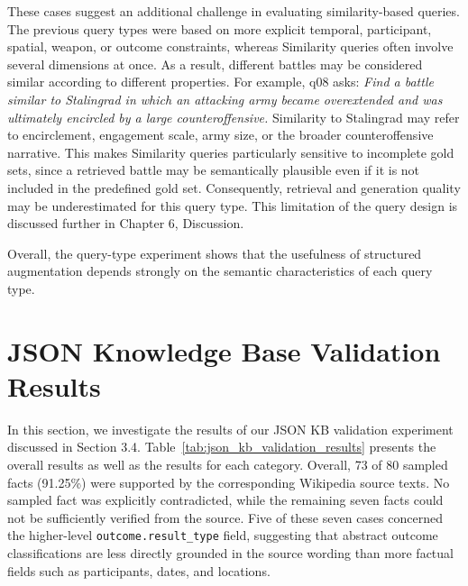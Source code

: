 These cases suggest an additional challenge in evaluating similarity-based queries. The previous query types were based on more explicit temporal, participant, spatial, weapon, or outcome constraints, whereas Similarity queries often involve several dimensions at once. As a result, different battles may be considered similar according to different properties. For example, q08 asks: \textit{Find a battle similar to Stalingrad in which an attacking army became overextended and was ultimately encircled by a large counteroffensive.} Similarity to Stalingrad may refer to encirclement, engagement scale, army size, or the broader counteroffensive narrative. This makes Similarity queries particularly sensitive to incomplete gold sets, since a retrieved battle may be semantically plausible even if it is not included in the predefined gold set. Consequently, retrieval and generation quality may be underestimated for this query type. This limitation of the query design is discussed further in Chapter 6, Discussion.

Overall, the query-type experiment shows that the usefulness of structured augmentation depends strongly on the semantic characteristics of each query type.
\section{JSON Knowledge Base Validation Results}
In this section, we investigate the results of our JSON KB validation experiment discussed in Section 3.4. Table~\ref{tab:json_kb_validation_results} presents the overall results as well as the results for each category. Overall, 73 of 80 sampled facts (91.25\%) were supported by the corresponding Wikipedia source texts. No sampled fact was explicitly contradicted, while the remaining seven facts could not be sufficiently verified from the source. Five of these seven cases concerned the higher-level \texttt{outcome.result\_type} field, suggesting that abstract outcome classifications are less directly grounded in the source wording than more factual fields such as participants, dates, and locations.

